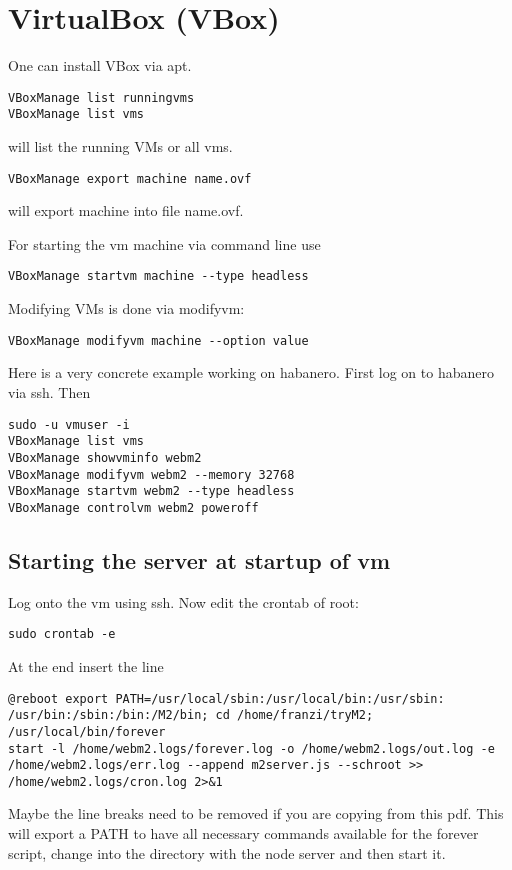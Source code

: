 \documentclass[a4paper]{book}
\begin{document}
\chapter{VirtualBox (VBox)}
One can install VBox via apt.

\begin{verbatim}
VBoxManage list runningvms
VBoxManage list vms
\end{verbatim}
will list the running VMs or all vms.

\begin{verbatim}
VBoxManage export machine name.ovf
\end{verbatim}
will export machine into file name.ovf.

For starting the vm machine via command line use
\begin{verbatim}
VBoxManage startvm machine --type headless
\end{verbatim}

Modifying VMs is done via modifyvm:
\begin{verbatim}
VBoxManage modifyvm machine --option value
\end{verbatim}

Here is a very concrete example working on habanero. First log on to habanero via ssh. Then
\begin{verbatim}
sudo -u vmuser -i
VBoxManage list vms
VBoxManage showvminfo webm2
VBoxManage modifyvm webm2 --memory 32768
VBoxManage startvm webm2 --type headless
VBoxManage controlvm webm2 poweroff
\end{verbatim}


\section{Starting the server at startup of vm}
Log onto the vm using ssh. Now edit the crontab of root:
\begin{verbatim}
sudo crontab -e
\end{verbatim}
At the end insert the line
\begin{verbatim}
@reboot export PATH=/usr/local/sbin:/usr/local/bin:/usr/sbin:
/usr/bin:/sbin:/bin:/M2/bin; cd /home/franzi/tryM2; /usr/local/bin/forever
start -l /home/webm2.logs/forever.log -o /home/webm2.logs/out.log -e
/home/webm2.logs/err.log --append m2server.js --schroot >>
/home/webm2.logs/cron.log 2>&1
\end{verbatim}
Maybe the line breaks need to be removed if you are copying from this pdf.
This will export a PATH to have all necessary commands available for the forever script, change into the directory with the node server and then start it.
\end{document}
